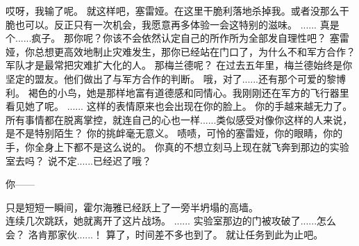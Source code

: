 \documentclass[openany]{book}
\begin{document}
\begin{dialogue}
     哎呀，我输了呢。
     就这样吧，塞雷娅。在这里干脆利落地杀掉我。或者没那么干脆也可以。反正只有一次机会，我愿意再多体验一会这特别的滋味。
     ......
     真是个......疯子。
     那你呢？你该不会依然认定自己的所作所为全部发自理性吧？
     塞雷娅，你总想更高效地制止灾难发生，那你已经站在门口了，为什么不和军方合作？
     军队才是最常把灾难扩大化的人。
     那梅兰德呢？
     在过去五年里，梅兰德始终是你坚定的盟友。他们做出了与军方合作的判断。
     哦，对了......还有那个可爱的黎博利。
     褐色的小鸟，她是那样地富有道德感和同情心。我刚刚还在军方的飞行器里看见她了呢。
     ......
     这样的表情原来也会出现在你的脸上。
     你的手越来越无力了。所有事情都在脱离掌控，就连自己的心也一样......类似感受对像你这样的人来说，是不是特别陌生？
     你的挑衅毫无意义。
     啧啧，可怜的塞雷娅，你的眼睛，你的手，你全身上下都不是这么说的。
     你真的不想立刻马上现在就飞奔到那边的实验室去吗？
     说不定......已经迟了哦？

     你——\par
    只是短短一瞬间，霍尔海雅已经跃上了一旁半坍塌的高墙。\\
    连续几次跳跃，她就离开了这片战场。
     ......
     实验室那边的门被攻破了......怎么会？
     洛肯那家伙......！
     算了，时间差不多也到了。
     就让任务到此为止吧。
\end{dialogue}
\end{document}
